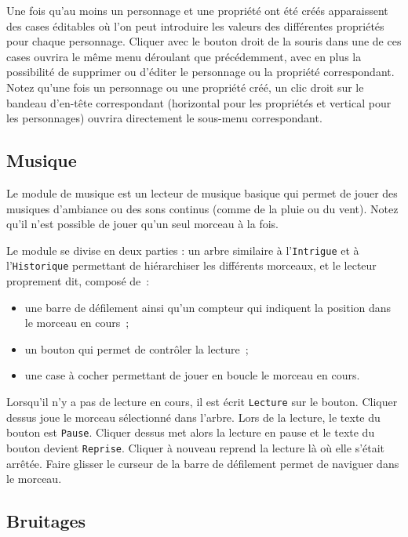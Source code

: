 \documentclass[a4paper,12pt]{article}
\newcommand*{\interfaceitem}[1]{\texttt{#1}}
\begin{document}
Une fois qu'au moins un personnage et une propriété ont été créés apparaissent des cases éditables où l'on peut introduire les valeurs des différentes propriétés pour chaque personnage.
Cliquer avec le bouton droit de la souris dans une de ces cases ouvrira le même menu déroulant que précédemment, avec en plus la possibilité de supprimer ou d'éditer le personnage ou la propriété correspondant.
Notez qu'une fois un personnage ou une propriété créé, un clic droit sur le bandeau d'en-tête correspondant (horizontal pour les propriétés et vertical pour les personnages) ouvrira directement le sous-menu correspondant.

\subsection{Musique}
\label{sec:musique}

Le module de musique est un lecteur de musique basique qui permet de jouer des musiques d'ambiance ou des sons continus (comme de la pluie ou du vent).
Notez qu'il n'est possible de jouer qu'un seul morceau à la fois.

Le module se divise en deux parties : un arbre similaire à l'\interfaceitem{Intrigue} et à l'\interfaceitem{Historique} permettant de hiérarchiser les différents morceaux, et le lecteur proprement dit, composé de~:
\begin{itemize}
    \item une barre de défilement ainsi qu'un compteur qui indiquent la position dans le morceau en cours~;
    \item un bouton qui permet de contrôler la lecture~;
    \item une case à cocher permettant de jouer en boucle le morceau en cours.
\end{itemize}
Lorsqu'il n'y a pas de lecture en cours, il est écrit \interfaceitem{Lecture} sur le bouton.
Cliquer dessus joue le morceau sélectionné dans l'arbre.
Lors de la lecture, le texte du bouton est \interfaceitem{Pause}.
Cliquer dessus met alors la lecture en pause et le texte du bouton devient \interfaceitem{Reprise}.
Cliquer à nouveau reprend la lecture là où elle s'était arrêtée.
Faire glisser le curseur de la barre de défilement permet de naviguer dans le morceau.

\subsection{Bruitages}
\label{sec:bruitages}
\end{document}

